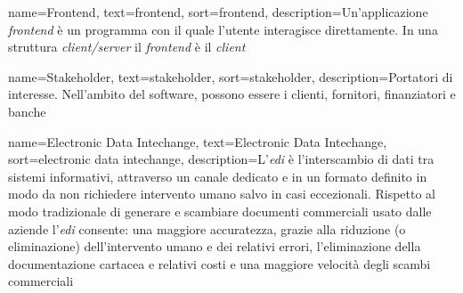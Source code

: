 {
    name=Frontend,
    text=frontend,
    sort=frontend,
    description={Un'applicazione \emph{frontend} è un programma con il quale l'utente interagisce direttamente. In una struttura \emph{client/server} il \emph{frontend} è il \emph{client}}
}

{
    name=Stakeholder,
    text=stakeholder,
    sort=stakeholder,
    description={Portatori di interesse. Nell'ambito del software, possono essere i clienti, fornitori, finanziatori e banche}
}

{
    name=Electronic Data Intechange,
    text=Electronic Data Intechange,
    sort=electronic data intechange,
    description={L'\emph{\acrfull{edi}} è l'interscambio di dati tra sistemi informativi, attraverso un canale dedicato e in un formato definito in modo da non richiedere intervento umano salvo in casi eccezionali. Rispetto al modo tradizionale di generare e scambiare documenti commerciali usato dalle aziende l'\emph{\acrshort{edi}} consente: una maggiore accuratezza, grazie alla riduzione (o eliminazione) dell'intervento umano e dei relativi errori, l'eliminazione della documentazione cartacea e relativi costi e una maggiore velocità degli scambi commerciali}
}

